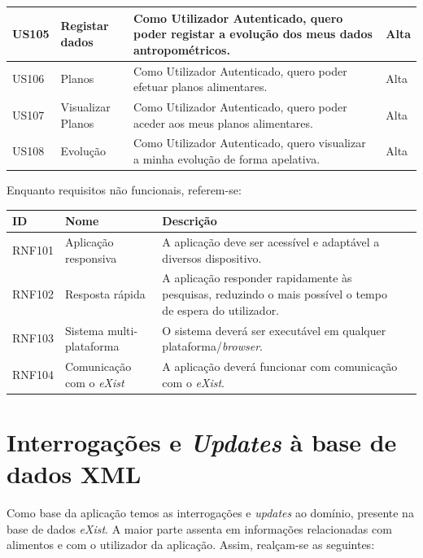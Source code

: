 \documentclass[twocolumn,twoside,11pt,a4paper]{article}
\begin{document}
\begin{center}
   \begin{tabular}{ | l | p{1.4cm} | p{3.0cm} | p{1.4cm}  |}
   \hline
      US105 & Registar dados &  Como Utilizador Autenticado, quero poder registar a evolução dos meus dados antropométricos. &  Alta  \\ \hline
   US106 & Planos &  Como Utilizador Autenticado, quero poder efetuar planos alimentares. &  Alta  \\ \hline
   US107 & Visualizar Planos &  Como Utilizador Autenticado, quero poder aceder aos meus planos alimentares. &  Alta  \\ \hline
   US108 & Evolução &  Como Utilizador Autenticado, quero visualizar a minha evolução de forma apelativa. &  Alta  \\ \hline
   \end{tabular}
\end{center}


Enquanto requisitos não funcionais, referem-se:

\begin{center}
   \begin{tabular}{ | l | p{2.1cm} | p{4.0cm} | p{1.8cm}  |}
   \hline
   ID & Nome & Descrição \\ \hline
   RNF101 & Aplicação responsiva & A aplicação deve ser acessível e adaptável a diversos dispositivo.  \\ \hline
   RNF102 & Resposta rápida & A aplicação responder rapidamente às pesquisas, reduzindo o mais possível o tempo de espera do utilizador.  \\ \hline
   RNF103 & Sistema multi-plataforma &  O sistema deverá ser executável em qualquer plataforma/\textit{browser}. \\ \hline
   RNF104 & Comunicação com o \textit{eXist} & A aplicação deverá funcionar com comunicação com o \textit{eXist}.\\ \hline
   \end{tabular}
\end{center}


\section{Interrogações e \textit{Updates} à base de dados XML}
Como base da aplicação temos as interrogações e \textit{updates} ao domínio, presente na base de dados \textit{eXist}. A maior parte assenta em informações relacionadas com alimentos e com o utilizador da aplicação. Assim, realçam-se as seguintes:
\end{document}
